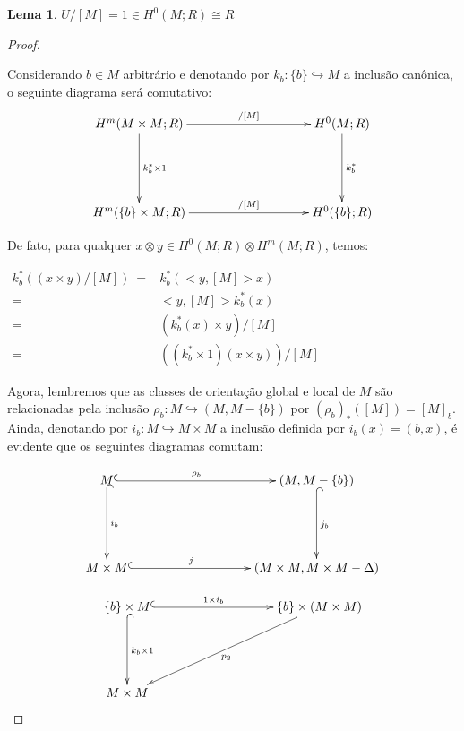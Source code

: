 \documentclass[12pt,oneside]{book} %
\newtheorem{lem}    {\hspace{0.5cm}Lema}[chapter]
\newcommand{\tensor}{\otimes}
\begin{document}
\begin{lem}\label{lema_tec_wu_2}
	$U/[M]=1\in H^{0}(M;R)\cong R$
\end{lem}

\begin{proof}
	
	\
	
	\par Considerando $b\in M$ arbitrário e denotando por $k_{b}:\{b\}\hookrightarrow M$ a inclusão canônica, o seguinte diagrama será comutativo:
	$$ \xymatrix @C=0.5cm {
		H^{m}(M\times M;R) \ar[rrrrr]^-{/[M]} \ar[dd]^-{k_{b}^{*}\times 1} &&&&& H^{0}(M;R) \ar[dd]^-{k_{b}^{*}} \\
		&&&&& \\
		H^{m}(\{b\}\times M;R) \ar[rrrrr]^-{/[M]} &&&&& H^{0}(\{b\};R)
	}$$
	
	\par De fato, para qualquer $x\tensor y\in H^{0}(M;R)\tensor H^{m}(M;R)$, temos:  \newline
	
	$ \begin{array}{rl}
		k_{b}^{*}\left( (x\times y)/[M] \right) \ = & k_{b}^{*}\left( <y,[M]>x \right) \\
		= & <y,[M]>k_{b}^{*}(x) \\
		= & \left( k_{b}^{*}(x)\times y \right) /[M] \\
		= & \left( (k_{b}^{*}\times 1)(x\times y) \right) /[M]
	\end{array} $ \newline
	
	\par Agora, lembremos que as classes de orientação global e local de $M$ são relacionadas pela inclusão $\rho_{b}:M\hookrightarrow (M,M-\{b\})$ por $(\rho_{b})_{*}([M])=[M]_{b}$. Ainda, denotando por $i_{b}:M\hookrightarrow M\times M$ a inclusão definida por $i_{b}(x)=(b,x)$, é evidente que os seguintes diagramas comutam:
	
	$$ \xymatrix @C=0.5cm {
		M \ar@{^(->}[rrrrr]^-{\rho_{b}} \ar@{^(->}[dd]^-{i_{b}} &&&&& (M,M-\{b\}) \ar@{^(->}[dd]^-{j_{b}} \\
		&&&&& \\
		M\times M \ar@{^(->}[rrrrr]^-{j} &&&&& (M\times M,M\times M-\Delta)
	} $$
	
	$$ \xymatrix @C=0.5cm {
		\{b\}\times M \ar@{^(->}[rrrrr]^-{1\times i_{b}} \ar@{^(->}[dd]^-{k_{b}\times 1} &&&&& \{b\}\times (M\times M) \ar[llllldd]^-{p_{2}} \\
		&&&&& \\
		M\times M
	}$$
	

\end{proof}
\end{document}
